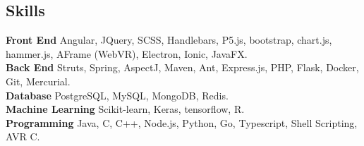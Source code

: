 \documentclass{resume}
\begin{document}
\begin{multicols*}{2}
\section*{Skills}
\noindent
\textbf{Front End} Angular, JQuery, SCSS, Handlebars, P5.js, bootstrap, chart.js, hammer.js, AFrame (WebVR), Electron, Ionic, JavaFX. \\
\textbf{Back End} Struts, Spring, AspectJ, Maven, Ant, Express.js, PHP, Flask, Docker, Git, Mercurial. \\
\textbf{Database} PostgreSQL, MySQL, MongoDB, Redis. \\
\textbf{Machine Learning} Scikit-learn, Keras, tensorflow, R. \\
\textbf{Programming} Java, C, C++, Node.js, Python, Go, Typescript, Shell Scripting, AVR C.

\end{multicols*}
\end{document}
